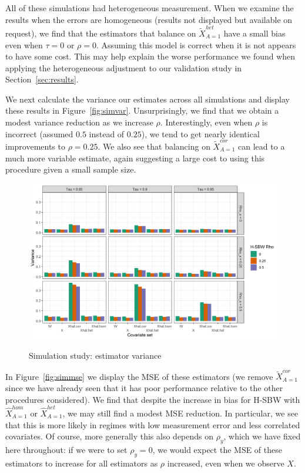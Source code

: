 All of these simulations had heterogeneous measurement. When we examine the results when the errors are homogeneous (results not displayed but available on request), we find that the estimators that balance on $\tilde{X}^{het}_{A=1}$ have a small bias even when $\tau = 0$ or $\rho = 0$. Assuming this model is correct when it is not appears to have some cost. This may help explain the worse performance we found when applying the heterogeneous adjustment to our validation study in Section~\ref{sec:results}.

We next calculate the variance our estimates across all simulations and display these results in Figure~\ref{fig:simvar}. Unsurprisingly, we find that we obtain a modest variance reduction as we increase $\rho$. Interestingly, even when $\rho$ is incorrect (assumed $0.5$ instead of $0.25$), we tend to get nearly identical improvements to $\rho = 0.25$. We also see that balancing on $\tilde{X}^{cor}_{A=1}$ can lead to a much more variable estimate, again suggesting a large cost to using this procedure given a small sample size.

\begin{figure}[H]
\begin{center}
    \caption{Simulation study: estimator variance}\label{fig:simvar}
    \label{fig:loveplotc1}
    \includegraphics[scale=0.5]{01_Plots/var-plot.png}
\end{center}
\end{figure}

In Figure~\ref{fig:simmse} we display the MSE of these estimators (we remove $\tilde{X}_{A=1}^{cor}$ since we have already seen that it has poor performance relative to the other procedures considered). We find that despite the increase in bias for H-SBW with $\hat{X}_{A=1}^{hom}$ or $\hat{X}_{A=1}^{het}$, we may still find a modest MSE reduction. In particular, we see that this is more likely in regimes with low measurement error and less correlated covariates. Of course, more generally this also depends on $\rho_y$, which we have fixed here throughout: if we were to set $\rho_y = 0$, we would expect the MSE of these estimators to increase for all estimators as $\rho$ increased, even when we observe $X$. 

